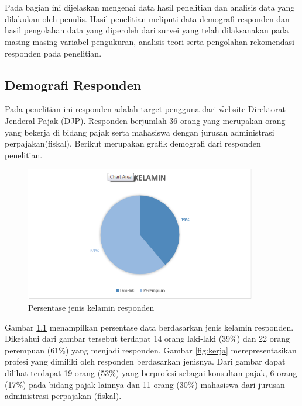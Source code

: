 \chapter{\babEmpat}
Pada bagian ini dijelaskan mengenai data hasil penelitian dan analisis data yang dilakukan oleh penulis. Hasil penelitian meliputi data demografi responden dan hasil pengolahan data yang diperoleh dari survei yang telah dilaksanakan pada masing-masing variabel pengukuran, analisis teori serta pengolahan rekomendasi responden pada penelitian.
\section{Demografi Responden}
Pada penelitian ini responden adalah target pengguna dari \f{website} Direktorat Jenderal Pajak (DJP). Responden berjumlah 36 orang yang merupakan orang yang bekerja di bidang pajak serta mahasiswa dengan jurusan administrasi perpajakan(fiskal). Berikut merupakan grafik demografi dari responden penelitian.
\begin{figure}
	\centering
	\includegraphics[width=0.9\textwidth,height=0.52\textwidth]
	{pics/jenisKelamin.PNG}
	\caption{Persentase jenis kelamin responden}
	\label{fig:jeniskelamin}
\end{figure}
\noindent
Gambar \ref{fig:jeniskelamin} menampilkan persentase data berdasarkan jenis kelamin responden. Diketahui dari gambar tersebut terdapat 14 orang laki-laki (39\%) dan 22 orang perempuan (61\%) yang menjadi responden. Gambar \ref{fig:kerja} merepresentasikan profesi yang dimiliki oleh responden berdasarkan jenisnya. Dari gambar dapat dilihat terdapat 19 orang (53\%) yang berprofesi sebagai konsultan pajak, 6 orang (17\%) pada bidang pajak lainnya dan 11 orang (30\%) mahasiswa dari jurusan administrasi perpajakan (fiskal).
